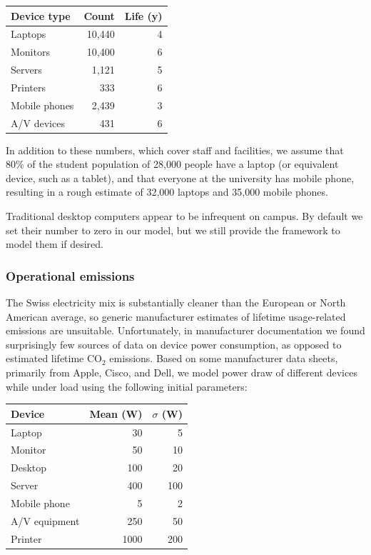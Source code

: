 \documentclass[11pt]{article}
\begin{document}
\begin{center}
  \begin{tabular}{|l|r|r|}
    \hline
    \textbf{Device type} & \textbf{Count} & \textbf{Life (y)}\\ \hline
    Laptops & 10,440 & 4 \\
    Monitors & 10,400 & 6 \\
    Servers & 1,121 & 5 \\
    Printers & 333 & 6 \\
    Mobile phones & 2,439 & 3 \\
    A/V devices & 431 & 6 \\ \hline
  \end{tabular}
  \label{tab:oncampusdevices}
\end{center}

In addition to these numbers, which cover staff and facilities, we assume that 80\% of the student population of 28,000 people have a laptop (or equivalent device, such as a tablet), and that everyone at the university has mobile phone, resulting in a rough estimate of 32,000 laptops and 35,000 mobile phones.

Traditional desktop computers appear to be infrequent on campus. By default we set their number to zero in our model, but we still provide the framework to model them if desired.

\subsubsection*{Operational emissions}

The Swiss electricity mix is substantially cleaner than the European or North American average, so generic manufacturer estimates of lifetime usage-related emissions are unsuitable. Unfortunately, in manufacturer documentation we found surprisingly few sources of data on device power consumption, as opposed to estimated lifetime CO$_2$ emissions. Based on some manufacturer data sheets, primarily from Apple, Cisco, and Dell, we model power draw of different devices while under load using the following initial parameters:

\begin{center}
  \begin{tabular}{|l|r|r|}
    \hline
    \textbf{Device} & \textbf{Mean (W)} & \textbf{$\sigma$ (W)} \\ \hline
    Laptop & 30 & 5 \\ \hline
    Monitor & 50 & 10 \\ \hline
    Desktop & 100 & 20 \\ \hline
    Server & 400 & 100 \\ \hline
    Mobile phone & 5 & 2 \\ \hline
    A/V equipment & 250 & 50 \\ \hline
    Printer & 1000 & 200 \\ \hline
  \end{tabular}
\end{center}
\end{document}
